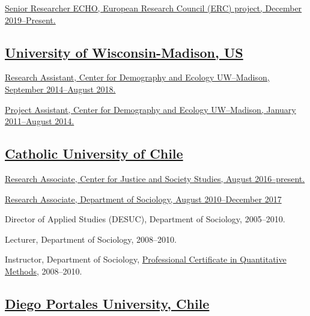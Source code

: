 \documentclass[10pt,letterpaper]{article}
\renewenvironment{itemize}{
  \begin{list}{}{
    \setlength{\leftmargin}{1.5em}
    \setlength{\itemsep}{0.25em}
    \setlength{\parskip}{0pt}
    \setlength{\parsep}{0.25em}
  }
}{
  \end{list}
}
\begin{document}
\begin{itemize}
\item \href{https://echo-erc.csic.es/}{Senior Researcher ECHO, European Research Council (ERC) project, December 2019--Present.}
\end{itemize}


\subsection*{\href{http://sociologia.uc.cl/}{University of Wisconsin-Madison, US}}

\begin{itemize}
\item \href{http://www.ssc.wisc.edu/cde/people/grads.php}{Research Assistant, Center for Demography and Ecology UW--Madison, September 2014--August 2018.}
\item \href{http://www.ssc.wisc.edu/cde/people/grads.php}{Project Assistant, Center for Demography and Ecology UW--Madison, January 2011--August 2014.}
\end{itemize}

\subsection*{\href{http://sociologia.uc.cl/}{Catholic University of Chile}}
 \begin{itemize}
 \item \href{http://justiciaysociedad.uc.cl/nosotros/investigadores-asociados}{Research Associate, Center for Justice and Society Studies, August 2016--present.}
 \item \href{http://sociologia.uc.cl/desuc}{Research Associate, Department of Sociology, August 2010--December 2017}
 \item Director of Applied Studies (DESUC), Department of Sociology, 2005--2010.
 \item Lecturer, Department of Sociology, 2008--2010.
 \item Instructor, Department of Sociology, \href{http://www.educacioncontinua.uc.cl}{Professional Certificate in Quantitative Methods}, 2008--2010.
 \end{itemize}

\subsection*{\href{http://www.udp.cl/facultades_carreras/ciencias_sociales-historia/}{Diego Portales University, Chile}}
\end{document}
